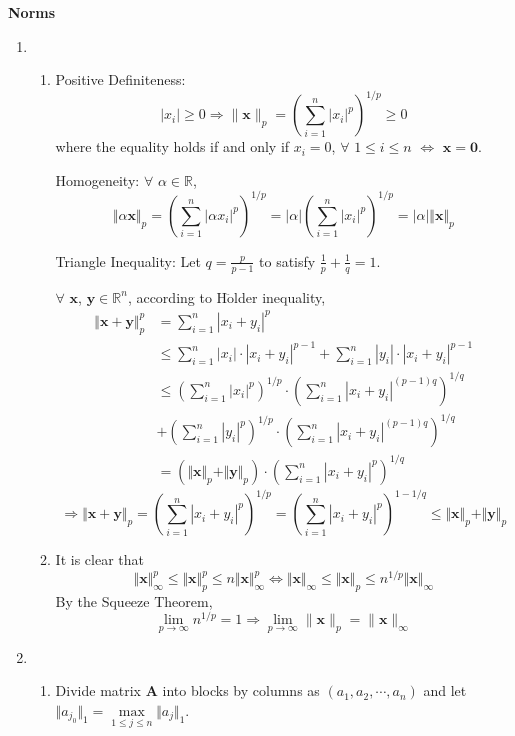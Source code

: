\documentclass[11pt,letter,notitlepage]{article}
\theoremstyle{definition}
\begin{document}
\begin{solution}\textbf{Norms}
\begin{enumerate}
\item 
	\begin{enumerate}
		\item
		 Positive Definiteness: 
		\[
		|x_i| \geq 0 \Longrightarrow \|\mathbf{x}\|_p = \left(\sum_{i=1}^n |x_i|^p\right)^{1/p} \geq 0
		\]
		where the equality holds if and only if $x_i = 0$, $\forall$ $1 \leq i \leq n$ $\Longleftrightarrow$ $\mathbf{x} = \mathbf{0}$.

		 Homogeneity: $\forall$ $\alpha \in \mathbb{R}$,
		\[
		\Vert \alpha \mathbf{x} \Vert_{p} = \left(\sum_{i=1}^n |\alpha x_i|^p\right)^{1/p} = |\alpha| \left(\sum_{i=1}^n |x_i|^p\right)^{1/p} = |\alpha| \Vert \mathbf{x} \Vert_{p}
		\]

		 Triangle Inequality: Let $q = \frac{p}{p-1}$ to satisfy $\frac{1}{p} + \frac{1}{q} = 1$.
		
		$\forall$ $\mathbf{x}$, $\mathbf{y}\in \mathbb{R}^n$, according to H$\ddot{\text{o}}$lder inequality,
		\begin{align*}
			\Vert \mathbf{x+y} \Vert_{p}^{p} &= \sum\limits_{i=1}^{n}|x_i+y_i|^{p}\\
			 &\leq \sum\limits_{i=1}^{n}|x_i| \cdot |x_i+y_i|^{p-1} + \sum\limits_{i=1}^{n}|y_i| \cdot |x_i+y_i|^{p-1}\\
			 & \leq \left(\sum\limits_{i=1}^{n} |x_i|^p\right)^{1/p} \cdot \left(\sum\limits_{i=1}^{n}|x_i+y_i|^{(p-1)q}\right)^{1/q}\\
			 & + \left(\sum\limits_{i=1}^{n} |y_i|^p\right)^{1/p} \cdot \left(\sum\limits_{i=1}^{n}|x_i+y_i|^{(p-1)q}\right)^{1/q}\\
			 & = \left(\Vert \mathbf{x} \Vert_{p} + \Vert \mathbf{y} \Vert_{p}\right) \cdot \left(\sum\limits_{i=1}^{n}|x_i+y_i|^{p}\right)^{1/q}
		\end{align*}
		\[
		\Longrightarrow
		\Vert \mathbf{x+y} \Vert_{p} = \left(\sum\limits_{i=1}^{n}|x_i+y_i|^{p}\right)^{1/p} = \left(\sum\limits_{i=1}^{n}|x_i+y_i|^{p}\right)^{1-1/q} \leq \Vert \mathbf{x} \Vert_{p} + \Vert \mathbf{y} \Vert_{p}
		\]
		\item 
		It is clear that
		\[
		\Vert \mathbf{x} \Vert_{\infty}^{p} \leq \Vert \mathbf{x} \Vert_{p}^{p} \leq n \Vert \mathbf{x} \Vert_{\infty}^{p}
		\Longleftrightarrow
		\Vert \mathbf{x} \Vert_{\infty} \leq \Vert \mathbf{x} \Vert_{p} \leq n^{1/p} \Vert \mathbf{x} \Vert_{\infty}
		\]
		By the Squeeze Theorem,
		\[
		\lim\limits_{p\to\infty} n^{1/p} = 1 \Longrightarrow \lim_{p\rightarrow \infty}\|\mathbf{x}\|_p = \|\mathbf{x}\|_{\infty}
		\]
	\end{enumerate}
\item
	\begin{enumerate}
		When $\mathbf{A} = \mathbf{0}$, the conclusion is trivial. Thus, the following discussion is based on $\mathbf{A} \neq \mathbf{0}$.
		\item Divide matrix $\mathbf{A}$ into blocks by columns as $\left(a_1, a_2, \cdots, a_n\right)$ and let $\Vert a_{j_0} \Vert_1 = \max\limits_{1 \leq j \leq n}\Vert a_j \Vert_1$.
		

\end{enumerate}
\end{enumerate}
\end{solution}
\end{document}
